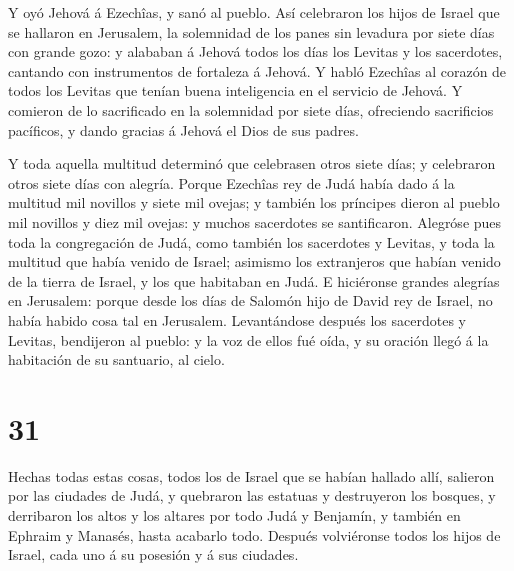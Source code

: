  Y oyó Jehová á Ezechîas, y sanó al pueblo. 
Así celebraron los hijos de Israel que se hallaron en Jerusalem, la
solemnidad de los panes sin levadura por siete días con grande gozo: y
alababan á Jehová todos los días los Levitas y los sacerdotes, cantando
con instrumentos de fortaleza á Jehová.  Y habló Ezechîas
al corazón de todos los Levitas que tenían buena inteligencia en el
servicio de Jehová. Y comieron de lo sacrificado en la solemnidad por
siete días, ofreciendo sacrificios pacíficos, y dando gracias á Jehová
el Dios de sus padres.

 Y toda aquella multitud determinó que celebrasen otros
siete días; y celebraron otros siete días con alegría. 
Porque Ezechîas rey de Judá había dado á la multitud mil novillos y
siete mil ovejas; y también los príncipes dieron al pueblo mil novillos
y diez mil ovejas: y muchos sacerdotes se santificaron. 
Alegróse pues toda la congregación de Judá, como también los sacerdotes
y Levitas, y toda la multitud que había venido de Israel; asimismo los
extranjeros que habían venido de la tierra de Israel, y los que
habitaban en Judá.  E hiciéronse grandes alegrías en
Jerusalem: porque desde los días de Salomón hijo de David rey de Israel,
no había habido cosa tal en Jerusalem.  Levantándose
después los sacerdotes y Levitas, bendijeron al pueblo: y la voz de
ellos fué oída, y su oración llegó á la habitación de su santuario, al
cielo.

\hypertarget{section-30}{%
\section{31}\label{section-30}}

 Hechas todas estas cosas, todos los de Israel que se habían
hallado allí, salieron por las ciudades de Judá, y quebraron las
estatuas y destruyeron los bosques, y derribaron los altos y los altares
por todo Judá y Benjamín, y también en Ephraim y Manasés, hasta acabarlo
todo. Después volviéronse todos los hijos de Israel, cada uno á su
posesión y á sus ciudades.

